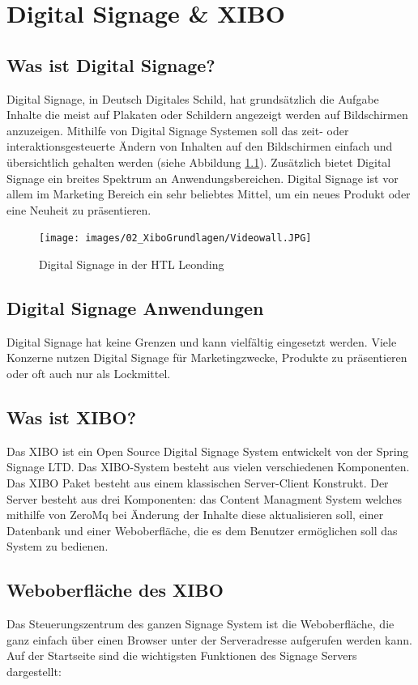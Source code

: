 \chapter{Digital Signage \& XIBO}
\section{Was ist Digital Signage?}\label{sec:digitalsignage}
Digital Signage, in Deutsch Digitales Schild, hat grundsätzlich die Aufgabe Inhalte die meist auf Plakaten oder Schildern angezeigt werden auf Bildschirmen anzuzeigen. Mithilfe von Digital Signage Systemen soll das zeit- oder interaktionsgesteuerte Ändern von Inhalten auf den Bildschirmen einfach und übersichtlich gehalten werden (siehe Abbildung \ref{img:digitalsignagehtlleonding}). Zusätzlich bietet Digital Signage ein breites Spektrum an Anwendungsbereichen. Digital Signage ist vor allem im Marketing Bereich ein sehr beliebtes Mittel, um ein neues Produkt oder eine Neuheit zu präsentieren.

\begin{figure}[H]
\centering
\texttt{[image: images/02\_XiboGrundlagen/Videowall.JPG]}
\caption{Digital Signage in der HTL Leonding}
\label{img:digitalsignagehtlleonding}
\end{figure}

\section{Digital Signage Anwendungen}\label{sec:anwendungedigitalsignage}
Digital Signage hat keine Grenzen und kann vielfältig eingesetzt werden. Viele Konzerne nutzen Digital Signage für Marketingzwecke, Produkte zu präsentieren oder oft auch nur als Lockmittel.

\section{Was ist XIBO?}\label{sec:xibo}
Das XIBO ist ein Open Source Digital Signage System entwickelt von der Spring Signage LTD. Das XIBO-System besteht aus vielen verschiedenen Komponenten. Das XIBO Paket besteht aus einem klassischen Server-Client Konstrukt. Der Server besteht aus drei Komponenten: das Content Managment System welches mithilfe von ZeroMq bei Änderung der Inhalte diese aktualisieren soll, einer Datenbank und einer Weboberfläche, die es dem Benutzer ermöglichen soll das System zu bedienen. \cite{xibo-server}

\section{Weboberfläche des XIBO}\label{sec:webpagexibo}
Das Steuerungszentrum des ganzen Signage System ist die Weboberfläche, die ganz einfach über einen Browser unter der Serveradresse aufgerufen werden kann. Auf der Startseite sind die wichtigsten Funktionen des Signage Servers dargestellt:

